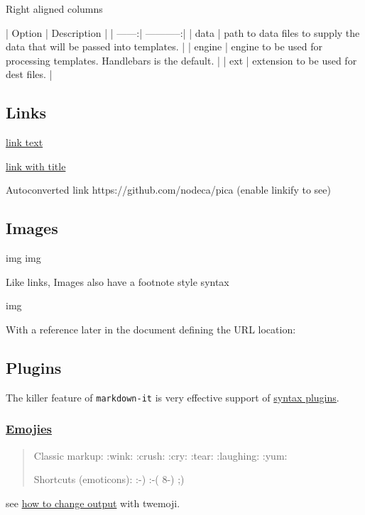 \documentclass{article}
\begin{document}
Right aligned columns

| Option | Description |
| ------:| -----------:|
| data   | path to data files to supply the data that will be passed into templates. |
| engine | engine to be used for processing templates. Handlebars is the default. |
| ext    | extension to be used for dest files. |



\subsection{Links}

\href{http://dev.nodeca.com}{link text}

\href{http://nodeca.github.io/pica/demo/}{link with title}

Autoconverted link https://github.com/nodeca/pica (enable linkify to see)



\subsection{Images}

img
img

Like links, Images also have a footnote style syntax

img

With a reference later in the document defining the URL location:





\subsection{Plugins}

The killer feature of \verb|markdown-it| is very effective support of
\href{https://www.npmjs.org/browse/keyword/markdown-it-plugin}{syntax plugins}.



\subsubsection{\href{https://github.com/markdown-it/markdown-it-emoji}{Emojies}}

\begin{quote}
Classic markup: :wink: :crush: :cry: :tear: :laughing: :yum:

Shortcuts (emoticons): :-) :-( 8-) ;)
\end{quote}

see \href{https://github.com/markdown-it/markdown-it-emoji#change-output}{how to change output} with twemoji.
\end{document}
